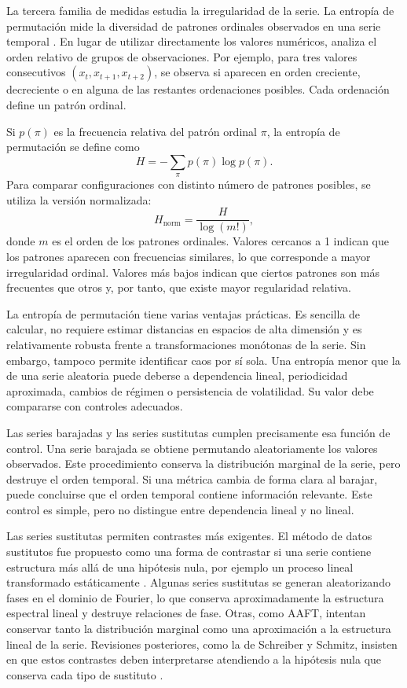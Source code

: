 La tercera familia de medidas estudia la irregularidad de la serie. La entropía de permutación mide la diversidad de patrones ordinales observados en una serie temporal \cite{bandt2002}. En lugar de utilizar directamente los valores numéricos, analiza el orden relativo de grupos de observaciones. Por ejemplo, para tres valores consecutivos \((x_t,x_{t+1},x_{t+2})\), se observa si aparecen en orden creciente, decreciente o en alguna de las restantes ordenaciones posibles. Cada ordenación define un patrón ordinal.

Si \(p(\pi)\) es la frecuencia relativa del patrón ordinal \(\pi\), la entropía de permutación se define como
\begin{equation}
    H=-\sum_{\pi}p(\pi)\log p(\pi).
\end{equation}
Para comparar configuraciones con distinto número de patrones posibles, se utiliza la versión normalizada:
\begin{equation}
    H_{\mathrm{norm}}=\frac{H}{\log(m!)},
\end{equation}
donde \(m\) es el orden de los patrones ordinales. Valores cercanos a 1 indican que los patrones aparecen con frecuencias similares, lo que corresponde a mayor irregularidad ordinal. Valores más bajos indican que ciertos patrones son más frecuentes que otros y, por tanto, que existe mayor regularidad relativa.

La entropía de permutación tiene varias ventajas prácticas. Es sencilla de calcular, no requiere estimar distancias en espacios de alta dimensión y es relativamente robusta frente a transformaciones monótonas de la serie. Sin embargo, tampoco permite identificar caos por sí sola. Una entropía menor que la de una serie aleatoria puede deberse a dependencia lineal, periodicidad aproximada, cambios de régimen o persistencia de volatilidad. Su valor debe compararse con controles adecuados.

Las series barajadas y las series sustitutas cumplen precisamente esa función de control. Una serie barajada se obtiene permutando aleatoriamente los valores observados. Este procedimiento conserva la distribución marginal de la serie, pero destruye el orden temporal. Si una métrica cambia de forma clara al barajar, puede concluirse que el orden temporal contiene información relevante. Este control es simple, pero no distingue entre dependencia lineal y no lineal.

Las series sustitutas permiten contrastes más exigentes. El método de datos sustitutos fue propuesto como una forma de contrastar si una serie contiene estructura más allá de una hipótesis nula, por ejemplo un proceso lineal transformado estáticamente \cite{theiler1992}. Algunas series sustitutas se generan aleatorizando fases en el dominio de Fourier, lo que conserva aproximadamente la estructura espectral lineal y destruye relaciones de fase. Otras, como AAFT, intentan conservar tanto la distribución marginal como una aproximación a la estructura lineal de la serie. Revisiones posteriores, como la de Schreiber y Schmitz, insisten en que estos contrastes deben interpretarse atendiendo a la hipótesis nula que conserva cada tipo de sustituto \cite{schreiber2000}.

